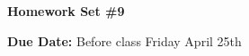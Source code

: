 

\def\xyprime{\ensuremath{\begin{pmatrix} x' \\ y' \end{pmatrix}}}



\thispagestyle{fancy}






\begin{center}
{\huge \textbf{Homework Set \#9}}
\large

{\textbf{ Due Date:} Before class Friday April 25th  }
\end{center}

